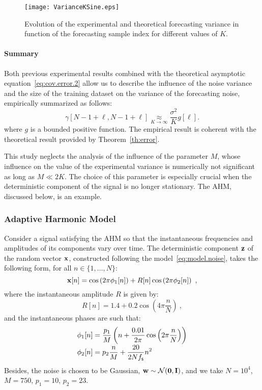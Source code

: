 \begin{figure}
\texttt{[image: VarianceKSine.eps]}
\caption{Evolution of the experimental and theoretical forecasting variance in function of the forecasting sample index for different values of $K$.}
\label{fig:res.size.sine}
\end{figure}

\paragraph{Summary}
Both previous experimental results combined with the theoretical asymptotic equation~\eqref{eq:cov.error.2} allow us to describe the influence of the noise variance and the size of the training dataset on the variance of the forecasting noise, empirically summarized as follows:
\begin{equation}
\gamma[N-1+\ell,N-1+\ell] \underset{K\to\infty}{\approx} \dfrac{\sigma^2}{K}g[\ell] .
\end{equation} 
where $g$ is a bounded positive function. The empirical result is coherent with the theoretical result provided by Theorem~\ref{th:error}.

This study neglects the analysis of the influence of the parameter $M$, whose influence on the value of the experimental variance is numerically not significant as long as $M\ll 2K$. The choice of this parameter is especially crucial when the deterministic component of the signal is no longer stationary. The AHM, discussed below, is an example.

\subsubsection{Adaptive Harmonic Model}
\label{ssse:res.ahm}
Consider a signal satisfying the AHM so that the instantaneous frequencies and amplitudes of its components vary over time. The deterministic component ${\mathbf z}$ of the random vector ${\mathbf x}$, constructed following the model~\eqref{eq:model.noise}, takes the following form, for all $n\in\{1,\ldots,N\}$:
\[
{\mathbf x}[n] = \cos\left(2\pi \phi_1[n] \right) + R[n]\cos\left(2\pi \phi_2[n] \right) \ ,
\] 
where the instantaneous amplitude $R$ is given by:
\[
R[n] = 1.4 + 0.2\cos\left(4\pi\frac{n}{N}\right)\ ,
\]
and the instantaneous phases are such that:
\begin{align*}
\phi_1[n] &= \frac{p_1}{M}\left( n + \frac{0.01}{2\pi}\cos\left(2\pi\frac{n}{N}\right) \right) \\[-1mm]
\phi_2[n] & = p_2\frac{n}{M} + \frac{20}{2Nf_{\mathsf s}}n^2
\end{align*}
Besides, the noise is chosen to be Gaussian, ${\mathbf w}\sim{\mathcal N}(\boldsymbol{0},{\mathbf I})$, and we take $N=10^4$, $M=750$, $p_1=10$, $p_2=23$.

